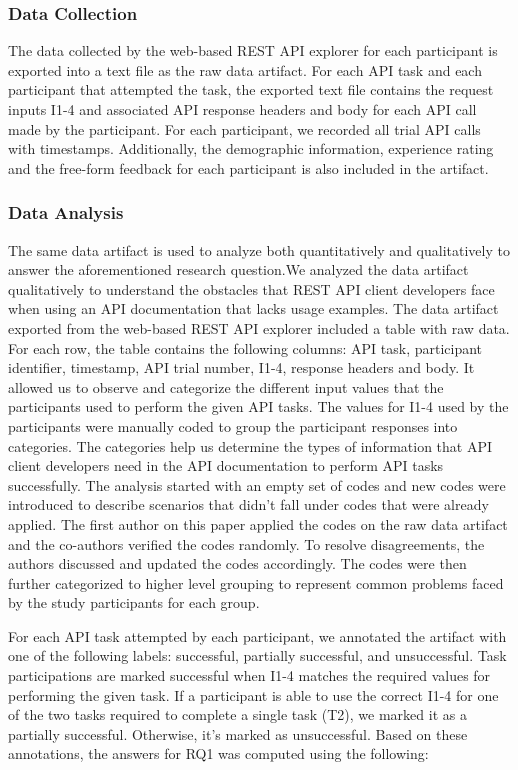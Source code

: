 \documentclass[conference]{IEEEtran}
\begin{document}
\subsubsection{Data Collection} %
The data collected by the web-based REST API explorer for each participant is exported into a text file as the raw data artifact. For each API task and each participant that attempted the task, the exported text file contains the request inputs I1-4 and associated API response headers and body for each API call made by the participant. For each participant, we recorded all trial API calls with timestamps. Additionally, the demographic information, experience rating and the free-form feedback for each participant is also included in the artifact.


\subsubsection{Data Analysis}
The same data artifact is used to analyze both quantitatively and qualitatively to answer the aforementioned research question.We analyzed the data artifact qualitatively to understand the obstacles that REST API client developers face when using an API documentation that lacks usage examples. The data artifact exported from the web-based REST API explorer included a table with raw data. For each row, the table contains the following columns: API task, participant identifier, timestamp, API trial number, I1-4, response headers and body. It allowed us to observe and categorize the different input values that the participants used to perform the given API tasks. The values for I1-4 used by the participants were manually coded to group the participant responses into categories. The categories help us determine the types of information that API client developers need in the API documentation to perform API tasks successfully. The analysis started with an empty set of codes and new codes were introduced to describe scenarios that didn't fall under  codes that were already applied. The first author on this paper applied the codes on the raw data artifact and the co-authors verified the codes randomly. To resolve disagreements, the authors discussed and updated the codes accordingly. The codes were then further categorized to higher level grouping to represent common problems faced by the study participants for each group.

For each API task attempted by each participant, we annotated the artifact with one of the following labels: successful, partially successful, and unsuccessful. Task participations are marked successful when I1-4 matches the required values for performing the given task. If a participant is able to use the correct I1-4 for one of the two tasks required to complete a single task (T2), we marked it as a partially successful. Otherwise, it's marked as unsuccessful. Based on these annotations, the answers for RQ1 was computed using the following:
\end{document}
